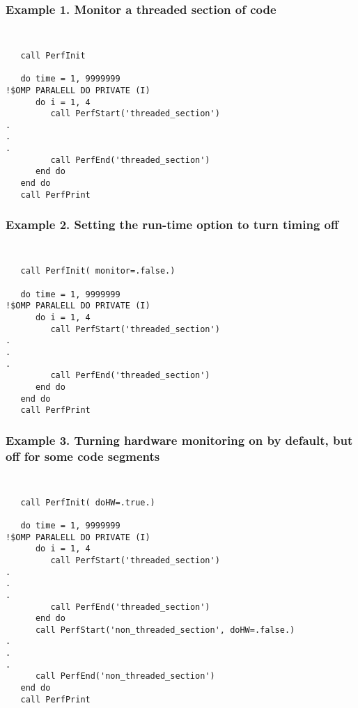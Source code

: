 %



\subsubsection{Example 1. Monitor a threaded section of code}
{\tt
\begin{verbatim}
   call PerfInit

   do time = 1, 9999999
!$OMP PARALELL DO PRIVATE (I)
      do i = 1, 4
         call PerfStart('threaded_section')
.
.
.
         call PerfEnd('threaded_section')
      end do
   end do
   call PerfPrint
\end{verbatim}
}
\subsubsection{Example 2. Setting the run-time option to turn timing off}
{\tt
\begin{verbatim}
   call PerfInit( monitor=.false.)

   do time = 1, 9999999
!$OMP PARALELL DO PRIVATE (I)
      do i = 1, 4
         call PerfStart('threaded_section')
.
.
.
         call PerfEnd('threaded_section')
      end do
   end do
   call PerfPrint
\end{verbatim}
}
\subsubsection{Example 3. Turning hardware monitoring on by default, but off 
for some code segments}
{\tt
\begin{verbatim}
   call PerfInit( doHW=.true.)

   do time = 1, 9999999
!$OMP PARALELL DO PRIVATE (I)
      do i = 1, 4
         call PerfStart('threaded_section')
.
.
.
         call PerfEnd('threaded_section')
      end do
      call PerfStart('non_threaded_section', doHW=.false.)
.
.
.
      call PerfEnd('non_threaded_section')
   end do
   call PerfPrint
\end{verbatim}
}
